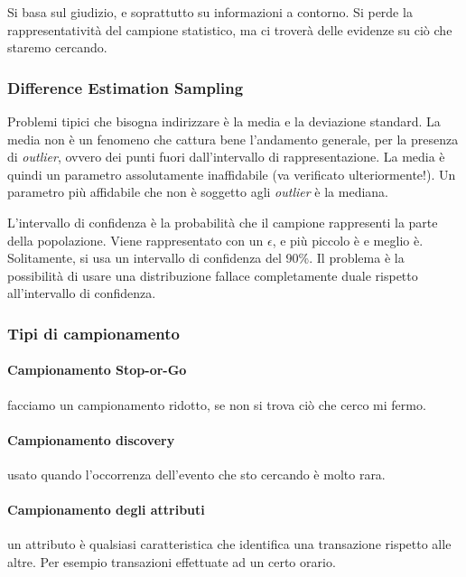 

Si basa sul giudizio, e soprattutto su informazioni a contorno. Si perde la rappresentatività del campione statistico, ma ci troverà delle evidenze su ciò che staremo cercando.

\subsubsection{Difference Estimation Sampling}

Problemi tipici che bisogna indirizzare è la media e la deviazione standard.
La media non è un fenomeno che cattura bene l'andamento generale, per la presenza di \textit{outlier}, ovvero dei punti fuori dall'intervallo di rappresentazione. %
La media è quindi un parametro assolutamente inaffidabile (va verificato ulteriormente!). Un parametro più affidabile che non è soggetto agli \textit{outlier} è la mediana.

L'intervallo di confidenza è la probabilità che il campione rappresenti la parte della popolazione. Viene rappresentato con un $\epsilon$, e più piccolo è e meglio è. Solitamente, si usa un intervallo di confidenza del 90\%. Il problema è la possibilità di usare una distribuzione fallace completamente duale rispetto all'intervallo di confidenza.


\subsubsection{Tipi di campionamento}

\paragraph*{Campionamento Stop-or-Go} facciamo un campionamento ridotto, se non si trova ciò che cerco mi fermo.

\paragraph*{Campionamento discovery} usato quando l'occorrenza dell'evento che sto cercando è molto rara.

\paragraph*{Campionamento degli attributi} un attributo è qualsiasi caratteristica che identifica una transazione rispetto alle altre. Per esempio transazioni effettuate ad un certo orario.


